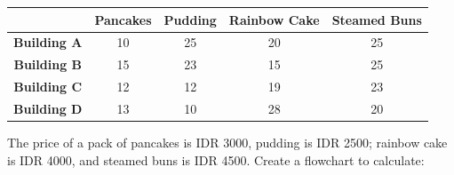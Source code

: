 \documentclass[12pt,titlepage]{article}
\begin{document}
\begin{table}[h]
    \begin{tabular}{|c|c|c|c|c|}
        \hline
        ~ & \textbf{Pancakes} & \textbf{Pudding} & \textbf{Rainbow Cake} & \textbf{Steamed Buns} \\
        \hline
        \textbf{Building A} & 10 & 25 & 20 & 25 \\
        \hline
        \textbf{Building B} & 15 & 23 & 15 & 25 \\
        \hline
        \textbf{Building C} & 12 & 12 & 19 & 23 \\
        \hline
        \textbf{Building D} & 13 & 10 & 28 & 20 \\
        \hline
    \end{tabular}
\end{table}
The price of a pack of pancakes is IDR 3000, pudding is IDR 2500; rainbow cake is
IDR 4000, and steamed buns is IDR 4500. Create a flowchart to calculate:
\end{document}
